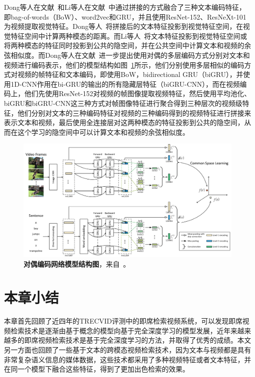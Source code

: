 Dong等人在文献~\cite{dong2018predicting}和Li等人在文献~\cite{li2019w2vv++}中通过拼接的方式融合了三种文本编码特征，即bag-of-words（BoW）、word2vec和GRU，并且使用ResNet-152、ResNeXt-101为视频提取视觉特征。Dong等人~\cite{dong2018predicting}将拼接后的文本特征投影到视觉特征空间，在视觉特征空间中计算两种模态的距离。而Li等人~\cite{li2019w2vv++}将文本特征投影到视觉特征空间或将两种模态的特征同时投影到公共的隐空间，并在公共空间中计算文本和视频的余弦相似度。而Dong等人在文献~\cite{dong2019dual}进一步提出使用对偶的多层编码方式分别对文本和视频进行编码表示，他们的模型结构如图~\ref{fig:related_dong2019}所示，他们分别使用多层相似的编码方式对视频的帧特征和文本编码，即使用BoW，bidirectional GRU（biGRU），并使用1D-CNN作用在bi-GRU的输出的所有隐藏层特征（biGRU-CNN），而在视频编码上，他们先使用ResNet-152对视频的帧图像提取视频特征，然后使用平均池化、biGRU和biGRU-CNN这三种方式对帧图像特征进行聚合得到三种层次的视频级特征，他们分别对文本的三种编码特征对视频的三种编码得到的视频特征进行拼接来表示文本和视频，最后使用全连接层对这两种模态的特征投影到公共的隐空间，从而在这个学习的隐空间中可以计算文本和视频的余弦相似度。

\begin{figure}[tbh!]
    \centering
    \includegraphics[width=\linewidth]{figures/related_dong2019}
    \caption[Dong等人~\cite{dong2019dual}的对偶编码网络模型结构图]{\textbf{对偶编码网络模型结构图}，来自~\cite{dong2019dual}。}
    \label{fig:related_dong2019}
\end{figure}

\section{本章小结}
本章首先回顾了近四年的TRECVID评测中的即席检索视频系统，可以发现即席视频检索技术是逐渐由基于概念的模型向基于完全深度学习的模型发展，近年来越来越多的即席视频检索技术是基于完全深度学习的方法，并取得了优秀的成绩。本文另一方面也回顾了一些基于文本的跨模态视频检索技术，因为文本与视频都是具有非常复杂语义信息的媒体数据，这些技术都采用了多种视频特征或者文本特征，并在同一个模型下融合这些特征，得到了更加出色检索的效果。
